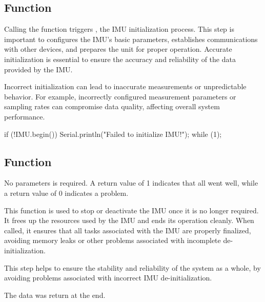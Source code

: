 \begin{code}
	
	
	\caption{Simple sketch using the sensor LSM9DS1 detection.}\label{TestWire}
	
\end{code}


\subsection{Function }


Calling the function triggers  , the IMU initialization process. This step is important to configures the IMU's basic parameters, establishes communications with other devices, and prepares the unit for proper operation. Accurate initialization is essential to ensure the accuracy and reliability of the data provided by the IMU. \cite{arduino_lsm9ds1:2024}

Incorrect initialization can lead to inaccurate measurements or unpredictable behavior. For example, incorrectly configured measurement parameters or sampling rates can compromise data quality, affecting overall system performance.


\begin{Arduino}
	if (!IMU.begin()) {
		Serial.println("Failed to initialize IMU!");
		while (1);	}
\end{Arduino}


\subsection{Function } 

No parameters is required. A return value of 1 indicates that all went well, while a return value of 0 indicates a problem. \cite{arduino_lsm9ds1:2024}

This function is used to stop or deactivate the IMU once it is no longer required. It frees up the resources used by the IMU and ends its operation cleanly. When called, it ensures that all tasks associated with the IMU are properly finalized, avoiding memory leaks or other problems associated with incomplete de-initialization.

This step helps to ensure the stability and reliability of the system as a whole, by avoiding problems associated with incorrect IMU de-initialization.

The data was return at the end. 

